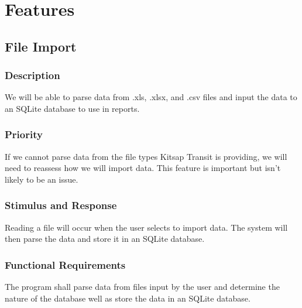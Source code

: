\section{Features}


\subsection{File Import}
\subsubsection{Description}
We will be able to parse data from .xls, .xlsx, and .csv files and input the data to an SQLite database to use in reports.

\subsubsection{Priority}
If we cannot parse data from the file types Kitsap Transit is providing, we will need to reassess how we will import data. This feature is important but isn't likely to be an issue.

\subsubsection{Stimulus and Response}
Reading a file will occur when the user selects to import data. The system will then parse the data and store it in an SQLite database.

\subsubsection{Functional Requirements}
The program shall parse data from files input by the user and determine the nature of the database well as store the data in an SQLite database.


